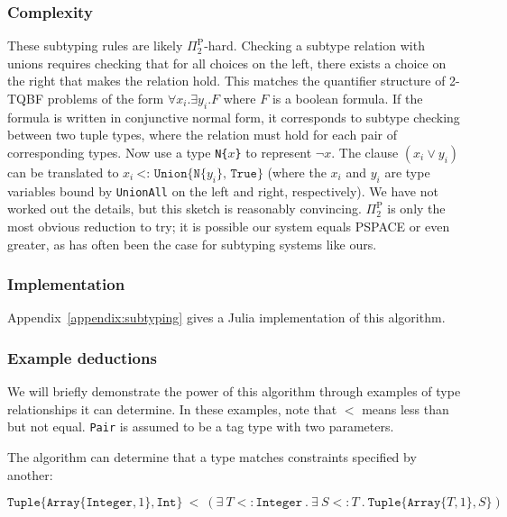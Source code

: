 
\subsubsection{Complexity}

These subtyping rules are likely $\Pi_2^{\textrm{P}}$-hard.
Checking a subtype relation with unions requires checking that for all choices
on the left, there exists a choice on the right that makes the relation hold.
This matches the quantifier structure of 2-TQBF problems of the form
$\forall x_i . \exists y_i . F$ where $F$ is a boolean formula.
If the formula is written in conjunctive normal form, it corresponds to subtype
checking between two tuple types, where the relation must hold for each pair of
corresponding types.
Now use a type \texttt{N\{}$x$\texttt{\}} to represent $\neg x$.
The clause $(x_i \vee y_i)$ can be translated to
$x_i\ \texttt{<:\ Union\{N\{}y_i\texttt{\}, True\}}$ (where the $x_i$ and
$y_i$ are type variables bound by \texttt{UnionAll} on the left and right,
respectively).
We have not worked out the details, but this sketch is reasonably
convincing.
$\Pi_2^{\textrm{P}}$ is only the most obvious reduction to try; it is possible our
system equals PSPACE or even greater, as has often been the case for subtyping
systems like ours.

\subsubsection{Implementation}

Appendix~\ref{appendix:subtyping} gives a Julia implementation of this
algorithm.

\subsubsection{Example deductions}

We will briefly demonstrate the power of this algorithm through examples of
type relationships it can determine.
In these examples, note that $<$ means less than but not equal.
\texttt{Pair} is assumed to be a tag type with two parameters.

\noindent
The algorithm can determine that a type matches constraints specified by another:

\vspace{-5ex}
\[
\texttt{Tuple}\{\texttt{Array}\{\texttt{Integer},1\}, \texttt{Int}\}\ <\ 
  (\exists\ T<:\texttt{Integer}\ .\ \exists\ S<:T\ .\ \texttt{Tuple}\{\texttt{Array}\{T,1\},S\})
\]

